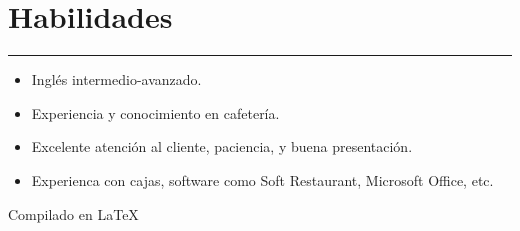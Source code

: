 \documentclass[10pt, a4paper]{article}
\begin{document}
\vspace{0.5cm}

\section*{\bfseries Habilidades}
\hrule
\vspace{0.2cm}
\begin{itemize}
    \item Inglés intermedio-avanzado.
    \item Experiencia y conocimiento en cafetería.
    \item Excelente atención al cliente, paciencia, y buena presentación.
    \item Experienca con cajas, software como Soft Restaurant, Microsoft Office, etc.
\end{itemize}

\vspace{0.9cm}

Compilado en \LaTeX 
\end{document}
